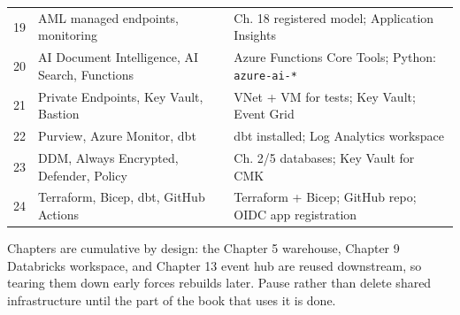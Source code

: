 \begin{center}
\begin{tabular}{@{}p{0.9cm}p{5.4cm}p{6.9cm}@{}}
19 & AML managed endpoints, monitoring & Ch. 18 registered model; Application Insights \\
20 & AI Document Intelligence, AI Search, Functions & Azure Functions Core Tools; Python: \texttt{azure-ai-*} \\
21 & Private Endpoints, Key Vault, Bastion & VNet + VM for tests; Key Vault; Event Grid \\
22 & Purview, Azure Monitor, dbt & dbt installed; Log Analytics workspace \\
23 & DDM, Always Encrypted, Defender, Policy & Ch. 2/5 databases; Key Vault for CMK \\
24 & Terraform, Bicep, dbt, GitHub Actions & Terraform + Bicep; GitHub repo; OIDC app registration \\
\bottomrule
\end{tabular}
\end{center}

Chapters are cumulative by design: the Chapter 5 warehouse, Chapter 9 Databricks workspace, and
Chapter 13 event hub are reused downstream, so tearing them down early forces rebuilds later.
Pause rather than delete shared infrastructure until the part of the book that uses it is done.
